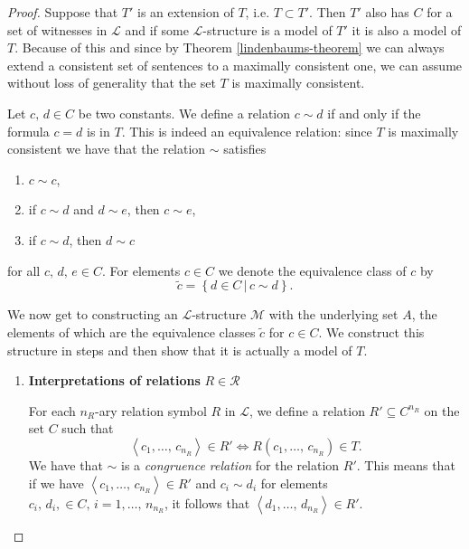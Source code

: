 \documentclass[../../main.tex]{subfiles}
\begin{document}
\begin{proof}
    Suppose that $T'$ is an extension of $T$, i.e. $T \subset T'$.
    Then $T'$ also has $C$ for a set of witnesses in $\mathcal{L}$ and if some $\mathcal{L}$-structure is a model of $T'$ it is also a model of $T$.
    Because of this and since by Theorem \ref{lindenbaums-theorem} we can always extend a consistent set of sentences to a maximally consistent one,
    we can assume without loss of generality that the set $T$ is maximally consistent.

    Let $c,\, d \in C$ be two constants. 
    We define a relation $c \sim d$ if and only if the formula $c = d$ is in $T$.
    This is indeed an equivalence relation: since $T$ is maximally consistent we have that the relation $\sim$ satisfies
    \begin{enumerate}[label=(\roman*)]
        \item $c \sim c$,
        \item if $c \sim d$ and $d \sim e$, then $c \sim e$,
        \item if $c \sim d$, then $d \sim c$
    \end{enumerate}
    for all $c,\, d,\, e \in C$.
    For elements $c \in C$ we denote the equivalence class of $c$ by
    $$\tilde{c} = \left\{d \in C \,\vert\,c \sim d\right\}.$$

    We now get to constructing an $\mathcal{L}$-structure $\mathcal{M}$ with the underlying set $A$,
    the elements of which are the equivalence classes $\tilde{c}$ for $c \in C$.
    We construct this structure in steps and then show that it is actually a model of $T$.
    \begin{enumerate}
        \item \label{lemma-proof-step-1} \textbf{Interpretations of relations} $R \in \mathcal{R}$
        
        For each $n_R$-ary relation symbol $R$ in $\mathcal{L}$,
        we define a relation $R' \subseteq C^{n_R}$ on the set $C$ such that
        \begin{equation}\label{congruence-eq}
            \left<c_1,\ldots,\,c_{n_R}\right> \in R' \iff R(c_1,\ldots,\,c_{n_R}) \in T.
        \end{equation}
        We have that $\sim$ is a \emph{congruence relation} for the relation $R'$.
        This means that if we have $\left<c_1,\ldots,\,c_{n_R}\right> \in R'$ and $c_i \sim d_i$ for elements $c_i,\, d_i, \in C,\, i = 1,\ldots,\, n_{n_R}$, 
        it follows that $\left<d_1,\ldots,\,d_{n_R}\right> \in R'$.
        

\end{enumerate}
\end{proof}
\end{document}
